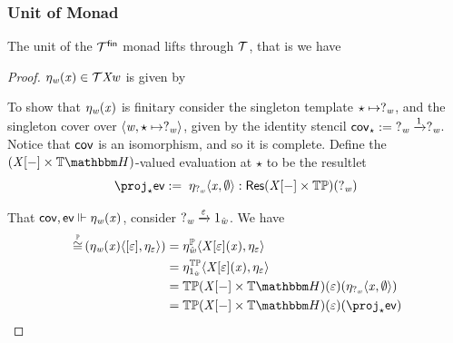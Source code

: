 \subsubsection{Unit of Monad}

\begin{theorem}
    The unit of the $\mathcal{T}^{\mathsf{fin}}$ monad lifts through $\mathcal{T}$, that is we have
\begin{center}
\end{center}
\end{theorem}

\begin{proof}
$\eta_{\mathit{w}}(\mathit{x}) \in \mathcal{T}\mathit{X}\mathit{w}$ is given by
\begin{center}
\end{center}

To show that $\eta_{\mathit{w}}(\mathit{x})$ is finitary consider the singleton template $\star \mapsto ?_{\mathit{w}}$,
and the singleton cover over $\langle\mathit{w}, \star \mapsto ?_{\mathit{w}}\rangle$, given by the identity stencil $\mathsf{cov}_\star :=\; ?_{\mathit{w}} \xrightarrow1 ?_{\mathit{w}}$.
Notice that $\mathsf{cov}$ is an isomorphism, and so it is complete.
Define the $(\vX\anyL\dash \times \theapF)$-valued evaluation at $\star$ to be the resultlet
\[ \proj_\star \ev \eqdef\; \eta_{?_\vw}\pair\vx\emptyset : \typeRes{(\vX\anyL\dash \times \thideMon)}(?_\vw) \]

That $\mathsf{cov},\mathsf{ev} \Vdash \eta_{\mathit{w}}(\mathit{x})$, consider $?_{\mathit{w}} \xrightarrow{\varepsilon} 1_{\hat{\mathit{w}}}$. We have
\begin{align*}
    \hmonIso(\eta_\vw(\vx)\pair{\anyL\me}{\mvarM_\me})
                       & = \eta^\hideMon_{\hat\vw}\pair{\vX\anyL\me(\vx)}{\mvarM_\me} \\
                       & = \eta^\thideMon_{\inclITI{\hat\vw}}\pair{\vX\anyL\me(\vx)}{\mvarM_\me} \\
                       & = \thideMon(\vX\anyL\dash \times \theapF)(\me)(\eta_{?_\vw}\pair\vx\emptyset) \\
                       & = \thideMon(\vX\anyL\dash \times \theapF)(\me)(\proj_\star \ev)
\end{align*}
\end{proof}

